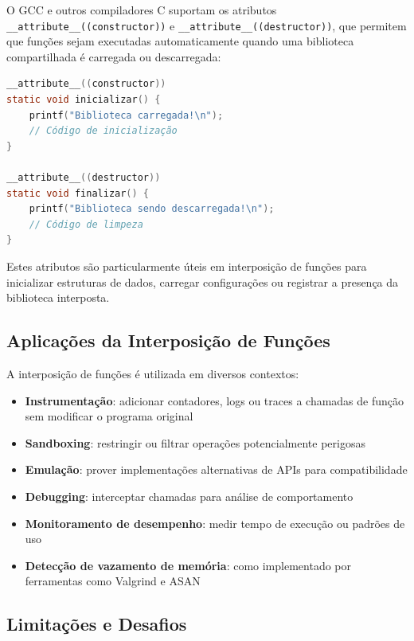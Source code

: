 O GCC e outros compiladores C suportam os atributos \texttt{\_\_attribute\_\_((constructor))} e \texttt{\_\_attribute\_\_((destructor))}, que permitem que funções sejam executadas automaticamente quando uma biblioteca compartilhada é carregada ou descarregada:

\begin{lstlisting}[language=C, caption={Uso de construtor e destrutor em biblioteca compartilhada}]
__attribute__((constructor))
static void inicializar() {
    printf("Biblioteca carregada!\n");
    // Código de inicialização
}

__attribute__((destructor))
static void finalizar() {
    printf("Biblioteca sendo descarregada!\n");
    // Código de limpeza
}
\end{lstlisting}

Estes atributos são particularmente úteis em interposição de funções para inicializar estruturas de dados, carregar configurações ou registrar a presença da biblioteca interposta.

\subsection{Aplicações da Interposição de Funções}

A interposição de funções é utilizada em diversos contextos:

\begin{itemize}
    \item \textbf{Instrumentação}: adicionar contadores, logs ou traces a chamadas de função sem modificar o programa original
    \item \textbf{Sandboxing}: restringir ou filtrar operações potencialmente perigosas
    \item \textbf{Emulação}: prover implementações alternativas de APIs para compatibilidade
    \item \textbf{Debugging}: interceptar chamadas para análise de comportamento
    \item \textbf{Monitoramento de desempenho}: medir tempo de execução ou padrões de uso
    \item \textbf{Detecção de vazamento de memória}: como implementado por ferramentas como Valgrind e ASAN
\end{itemize}

\subsection{Limitações e Desafios}

